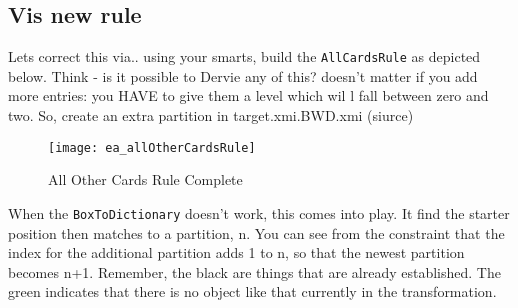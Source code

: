 \newpage
\hypertarget{allCards vis}{}
\subsection{Vis new rule}
\visHeader

Lets correct this via.. using your smarts, build the \texttt{AllCardsRule} as depicted below. Think - is it possible to Dervie any of this?
doesn't matter if you add more entries: you HAVE to give them a level which wil l fall between zero and two.
So, create an extra partition in target.xmi.BWD.xmi (siurce)

\begin{figure}[htbp]
\begin{center}
  \texttt{[image: ea\_allOtherCardsRule]}
  \caption{All Other Cards Rule Complete}
  \label{fig:allOtherCardsRule}
\end{center}
\end{figure}

When the \texttt{BoxToDictionary} doesn't work, this comes into play. It find the starter position then matches to a partition, n. You can see from the
constraint that the index for the additional partition adds 1 to n, so that the newest partition becomes n+1. Remember, the black are things that are already
established. The green indicates that there is no object like that currently in the transformation.
